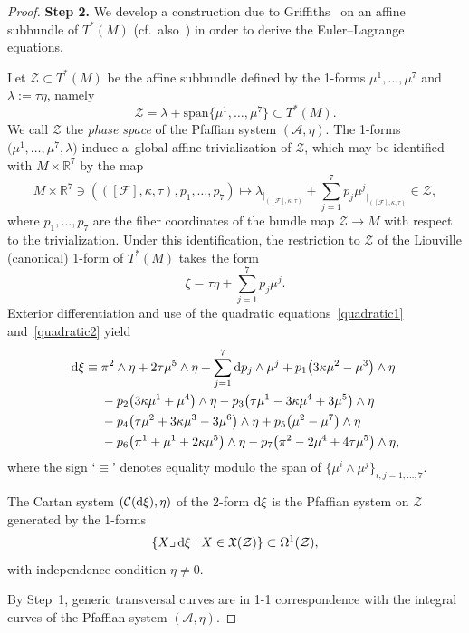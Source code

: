 \documentclass[10pt,a4paper]{amsart}
\numberwithin{equation}{section}
\begin{document}
\begin{proof}
\textbf{Step 2.}
We develop a construction due to Griffiths~\cite{Gr} on an affine subbundle of $T^*(M)$
 (cf.\ also~\cite{Bryant1987,Hsu, GM}) in order to derive the Euler--Lagrange equations.

Let $\mathcal{Z} \subset T^*(M)$ be the affine subbundle defined by
the 1-forms $\mu^1,\dots,\mu^7$ and $\lambda := \tau \eta$, namely
\[
 \mathcal{Z}=\lambda+\text{span}\big\{\mu^1,\dots,\mu^7\big\} \subset T^*(M).
\]
 We call $\mathcal{Z}$ the \textit{phase space} of the Pfaffian system $(\mathcal{A},\eta)$.
The 1-forms $\big(\mu^1,\dots,\mu^7, {\lambda}\big)$ induce a~global affine trivialization of $\mathcal{Z}$, which
may be identified with $M \times \mathbb{R}^7$ by the map
\[
M\times \mathbb{R}^7 \ni (([\mathcal{F}], \kappa, \tau), p_1, \dots, p_7) \longmapsto
{\lambda_{|_{([\mathcal{F}], \kappa, \tau)}} }
+ \sum_{j=1}^7 p_j{\mu^j}_{|_{([\mathcal{F}], \kappa, \tau)}} \in \mathcal{Z} ,
\]
where $p_1,\dots, p_7$ are the fiber coordinates of the bundle map $\mathcal{Z} \to M$ with respect to the trivialization.
Under this identification, the restriction to $\mathcal{Z}$ of the Liouville (canonical) 1-form of $T^*(M)$ takes the form
\[
 \xi=\tau  \eta + \sum_{j=1}^7p_j\mu^j .
 \]
Exterior differentiation and use of the quadratic equations~\eqref{quadratic1} and~\eqref{quadratic2} yield
\begin{align*}
 {\rm d}\xi\equiv{}& \pi^2\wedge\eta
+ 2\tau \mu^5 \wedge \eta + \sum_{j=1}^7{\rm d}p_j\wedge\mu^j + p_1\big(3\kappa\mu^2-\mu^3\big)\wedge\eta \\
&{} - p_2\big(3\kappa\mu^1+\mu^4\big)\wedge\eta - p_3\big(\tau\mu^1-3\kappa\mu^4+3\mu^5\big)\wedge\eta \\
 &{} - p_4\big(\tau\mu^2+3\kappa\mu^3-3\mu^6\big)\wedge\eta
 + p_5\big(\mu^2-\mu^7\big)\wedge\eta\\
 &{} - p_6\big(\pi^1+\mu^1+ 2\kappa\mu^5\big)\wedge\eta - p_7\big(\pi^2-2\mu^4+4\tau\mu^5\big)\wedge\eta  ,
\end{align*}
where the sign `$\equiv$' denotes equality modulo the span of $\{ \mu^i\wedge\mu^ j\}_{ i,j = 1,\dots,7}$.

The Cartan system $(\mathcal{C}({\rm d}\xi), \eta)$ of the
2-form ${\rm d}\xi$ is the Pfaffian system on $\mathcal{Z}$ generated by the 1-forms
\[
\left\{X {\lrcorner} \,{\rm d}\xi \mid X \in \mathfrak{X}(\mathcal{Z}) \right\}\subset \Omega^1(\mathcal{Z}),
\]
with independence condition $\eta \neq 0$.

By Step~1, generic transversal curves are in 1-1 correspondence with the integral curves of the
Pfaffian system $(\mathcal{A},\eta)$.


\end{proof}
\end{document}
